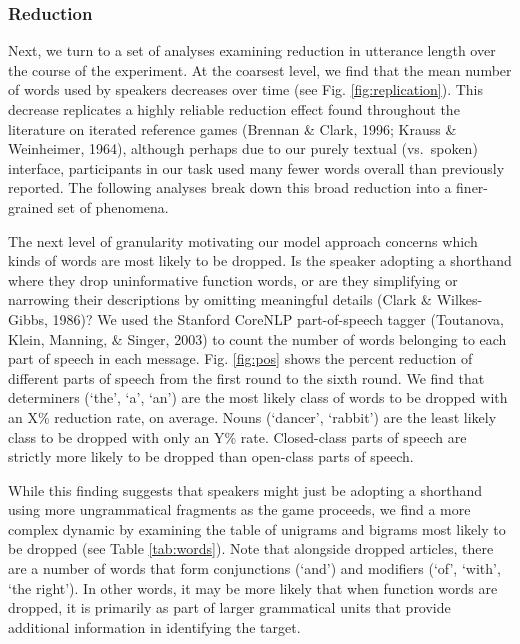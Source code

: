 \documentclass[manuscript]{stjour}
\begin{document}
\subsubsection{Reduction}\label{reduction}

Next, we turn to a set of analyses examining reduction in utterance
length over the course of the experiment. At the coarsest level, we find
that the mean number of words used by speakers decreases over time (see
Fig. \ref{fig:replication}). This decrease replicates a highly reliable
reduction effect found throughout the literature on iterated reference
games (Brennan \& Clark, 1996; Krauss \& Weinheimer, 1964), although
perhaps due to our purely textual (vs.~spoken) interface, participants
in our task used many fewer words overall than previously reported. The
following analyses break down this broad reduction into a finer-grained
set of phenomena.

The next level of granularity motivating our model approach concerns
which kinds of words are most likely to be dropped. Is the speaker
adopting a shorthand where they drop uninformative function words, or
are they simplifying or narrowing their descriptions by omitting
meaningful details (Clark \& Wilkes-Gibbs, 1986)? We used the Stanford
CoreNLP part-of-speech tagger (Toutanova, Klein, Manning, \& Singer,
2003) to count the number of words belonging to each part of speech in
each message. Fig. \ref{fig:pos} shows the percent reduction of
different parts of speech from the first round to the sixth round. We
find that determiners (`the', `a', `an') are the most likely class of
words to be dropped with an X\% reduction rate, on average. Nouns
(`dancer', `rabbit') are the least likely class to be dropped with only
an Y\% rate. Closed-class parts of speech are strictly more likely to be
dropped than open-class parts of speech.

While this finding suggests that speakers might just be adopting a
shorthand using more ungrammatical fragments as the game proceeds, we
find a more complex dynamic by examining the table of unigrams and
bigrams most likely to be dropped (see Table \ref{tab:words}). Note that
alongside dropped articles, there are a number of words that form
conjunctions (`and') and modifiers (`of', `with', `the right'). In other
words, it may be more likely that when function words are dropped, it is
primarily as part of larger grammatical units that provide additional
information in identifying the target.
\end{document}
